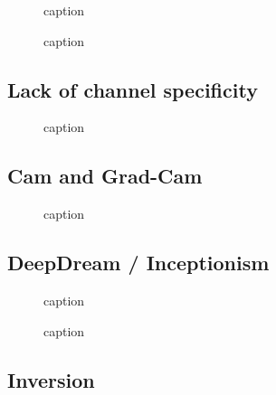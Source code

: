 \documentclass[11pt]{article}
\begin{document}
\begin{figure}[H]
    \centering
    \caption{caption}
\end{figure}

\begin{figure}[H]
    \centering
    \caption{caption}
\end{figure}

\subsection{Lack of channel specificity}

\begin{figure}[H]
    \centering
    \caption{caption}
\end{figure}

\subsection{Cam and Grad-Cam}

\begin{figure}[H]
    \centering
    \caption{caption}
\end{figure}

\subsection{DeepDream / Inceptionism}

\begin{figure}[H]
    \centering
    \caption{caption}
\end{figure}

\begin{figure}[H]
    \centering
    \caption{caption}
\end{figure}

\subsection{Inversion}
\end{document}
